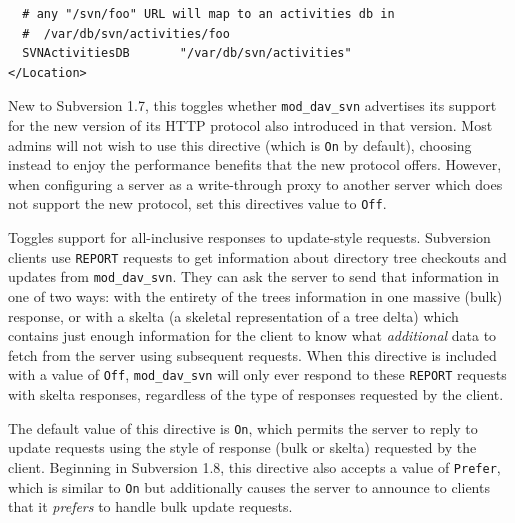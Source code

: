 \begin{description}
\begin{verbatim}
  # any "/svn/foo" URL will map to an activities db in
  #  /var/db/svn/activities/foo
  SVNActivitiesDB       "/var/db/svn/activities"
</Location>
\end{verbatim}
\item[\texttt{SVNAdvertiseV2Protocol\ On\textbar{}Off}]
New to Subversion 1.7, this toggles whether \texttt{mod\_dav\_svn}
advertises its support for the new version of its HTTP protocol also
introduced in that version. Most admins will not wish to use this
directive (which is \texttt{On} by default), choosing instead to enjoy
the performance benefits that the new protocol offers. However, when
configuring a server as a write-through proxy to another server which
does not support the new protocol, set this directive\textquotesingle s
value to \texttt{Off}.
\item[\texttt{SVNAllowBulkUpdates\ On\textbar{}Off\textbar{}Prefer}]
Toggles support for all-inclusive responses to update-style requests.
Subversion clients use \texttt{REPORT} requests to get information about
directory tree checkouts and updates from \texttt{mod\_dav\_svn}. They
can ask the server to send that information in one of two ways: with the
entirety of the tree\textquotesingle s information in one massive (bulk)
response, or with a skelta (a skeletal representation of a tree delta)
which contains just enough information for the client to know what
\emph{additional} data to fetch from the server using subsequent
requests. When this directive is included with a value of \texttt{Off},
\texttt{mod\_dav\_svn} will only ever respond to these \texttt{REPORT}
requests with skelta responses, regardless of the type of responses
requested by the client.

The default value of this directive is \texttt{On}, which permits the
server to reply to update requests using the style of response (bulk or
skelta) requested by the client. Beginning in Subversion 1.8, this
directive also accepts a value of \texttt{Prefer}, which is similar to
\texttt{On} but additionally causes the server to announce to clients
that it \emph{prefers} to handle bulk update requests.


\end{description}
